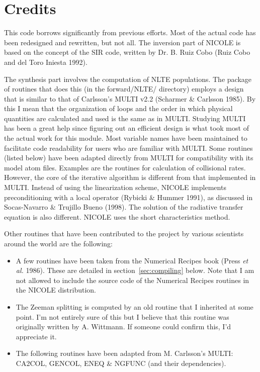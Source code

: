 \section{Credits}
\label{sec:credits}

This code borrows significantly from previous efforts. Most of the
actual code has been redesigned and rewritten, but not all. The
inversion part of NICOLE is based on the concept of the SIR code,
written by Dr. B. Ruiz Cobo (Ruiz Cobo and del Toro Iniesta 1992).

The synthesis part involves the computation of NLTE populations. The
package of routines that does this (in the forward/NLTE/ directory)
employs a design that is similar to that of Carlsson's MULTI v2.2
(Scharmer \& Carlsson 1985). By this I mean that the organization of
loops and the order in which physical quantities are calculated and
used is the same as in MULTI. Studying MULTI has been a great help
since figuring out an efficient design is what took most of the actual
work for this module. Most variable names have been maintained to
facilitate code readability for users who are familiar with
MULTI. Some routines (listed below) have been adapted directly from
MULTI for compatibility with its model atom files. Examples are the
routines for calculation of collisional rates. However, the core of
the iterative algorithm is different from that implemented in
MULTI. Instead of using the linearization scheme, NICOLE implements
preconditioning with a local operator (Rybicki \& Hummer 1991), as
discussed in Socas-Navarro \& Trujillo Bueno (1998). The solution of
the radiative transfer equation is also different. NICOLE uses the
short characteristics method.

Other routines that have been contributed to the project by various
scientists around the world are the following:
\begin{itemize}
  \item A few routines have been taken from the Numerical Recipes book
    (Press {\em et al.} 1986). These are detailed in
    section~\ref{sec:compiling} below. Note that I am not allowed to
    include the source code of the Numerical Recipes routines in the
    NICOLE distribution.
  \item The Zeeman splitting is computed by an old routine that I
    inherited at some point. I'm not entirely sure of this but I
    believe that this routine was originally written by
    A. Wittmann. If someone could confirm this, I'd appreciate it.
  \item The following routines have been adapted from M. Carlsson's
    MULTI: CA2COL, GENCOL, ENEQ \& NGFUNC (and their dependencies).
\end{itemize}



